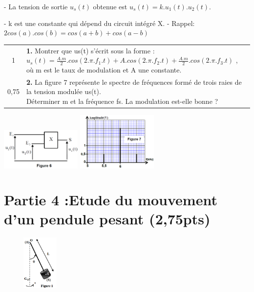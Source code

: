 \documentclass[12pt]{article}
\begin{document}
- La tension de sortie $u_s(t)$ obtenue est  $u_s(t) = k.u_1(t).u_2(t)$.

- k est une constante qui dépend du circuit intégré X.
- Rappel: $2cos(a).cos(b) = cos(a+b) + cos(a-b)$

\begin{tabular}{c|l}
	1  & \makecell[l]{\textbf{1. }Montrer que us(t) s’écrit sous la forme : \\$u_s(t) = \frac{A.m}{2}.cos(2.\pi.f_1.t) + A.cos(2.\pi.f_2.t) + \frac{A.m}{2}.cos(2.\pi.f_3.t)$ , où m est le taux de modulation\\ et A une constante.}\\
	0,75 & \makecell[l]{\textbf{2. }La figure 7 représente le spectre de fréquences formé de trois raies de la tension modulée us(t). \\Déterminer m et
la fréquence fs. La modulation est-elle bonne ?}\\
		\end{tabular}


\begin{center}
  \includegraphics[width=0.3\textwidth]{./img/mod01.png}
  \includegraphics[width=0.3\textwidth]{./img/mod02.png}
\end{center}






\section*{Partie 4 :Etude du mouvement d’un pendule pesant \dotfill(2,75pts)}

\begin{figure}
	\vspace{-1.2cm}
\begin{center}
  \includegraphics[width=0.16\textwidth]{./img/pendule011.png}
\end{center}
\end{figure}
\end{document}
